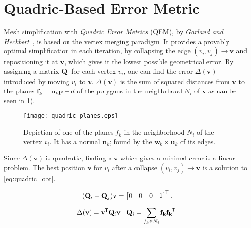 \section{Quadric-Based Error Metric} \label{sec:quadric-based_error_metric}

Mesh simplification with \emph{Quadric Error Metrics} (QEM), by \emph{Garland and Heckbert}~\cite{garland1997surface}, is based on the vertex merging paradigm. It provides a provably optimal simplification in each iteration, by collapsing the edge \((v_i, v_j) \rightarrow \mathbf{v}\) and repositioning it at \(\mathbf{v}\), which gives it the lowest possible geometrical error. By assigning a matrix \(\mathbf{Q}_i\) for each vertex \(v_i\), one can find the error \(\Delta(\mathbf{v})\) introduced by moving \(v_i\) to \(\mathbf{v}\). \(\Delta(\mathbf{v})\) is the sum of squared distances from \(\mathbf{v}\) to the planes \(\mathbf{f}_k = \mathbf{n}_k\mathbf{p} + d\) of the polygons in the neighbrhood \(N_i\) of \(\mathbf{v}\) as can be seen in \cref{fig:quadrics}).

\begin{figure}[ht]
  \centering
  \texttt{[image: quadric\_planes.eps]}
  \caption[Planes of neighboring faces]{Depiction of one of the planes \(f_k\) in the neighborhood \(N_i\) of the vertex \(v_i\). It has a normal \(\mathbf{n}_k\); found by the \(\mathbf{w}_k \times \mathbf{u}_k\) of its edges.}
  \label{fig:quadrics}
\end{figure}


Since \(\Delta(\mathbf{v})\) is quadratic, finding a \(\mathbf{v}\) which gives a minimal error is a linear problem. The best position \(\mathbf{v}\) for \(v_i\) after a collapse \((v_i, v_j) \rightarrow \mathbf{v}\) is a solution to \cref{eq:quadric_opt}.

\begin{equation} \label{eq:quadric_opt}
(\mathbf{Q}_i + \mathbf{Q}_j)\mathbf{v} = \begin{bmatrix} 0 & 0 & 0 & 1 \end{bmatrix}^{\mkern-1.5mu\mathsf{T}}.
\end{equation}

\begin{equation} \label{eq:homogeneous_quadric}
      \Delta(\mathbf{v}) = \mathbf{v}^{\mkern-1.5mu\mathsf{T}} \mathbf{Q}_i  \mathbf{v} \;\;\; \mathbf{Q}_i = \sum_{f_k \in N_i}  \mathbf{f_k} \mathbf{f_k}^{\mkern-1.5mu\mathsf{T}} \;
\end{equation}

